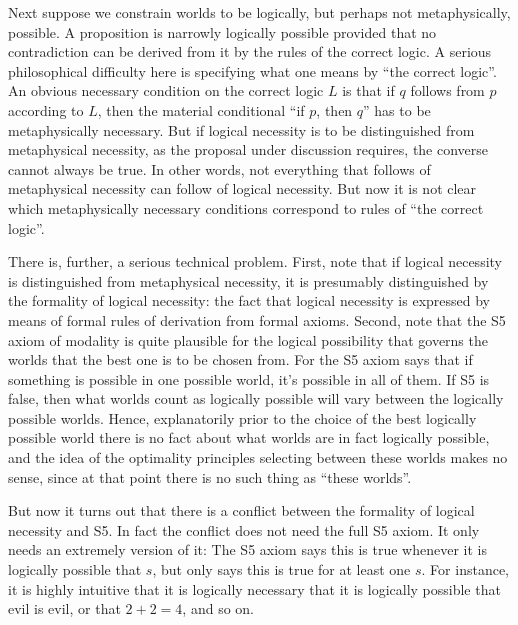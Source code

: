 Next suppose we constrain worlds to be logically, but perhaps not metaphysically, possible. A proposition is narrowly logically
possible provided that no contradiction can be derived from it by the rules of the correct logic. A serious philosophical 
difficulty here is specifying what one means by ``the correct logic''. An obvious necessary condition on the correct logic $L$
is that if $q$ follows from $p$ according to $L$, then the material conditional ``if $p$, then $q$'' has to be metaphysically
necessary. But if logical necessity is to be distinguished from metaphysical necessity, as the proposal under discussion requires,
the converse cannot always be true. In other words, not everything that follows of metaphysical necessity can follow of logical
necessity. But now it is not clear which metaphysically necessary conditions correspond to rules of ``the correct logic''.

There is, further, a serious technical problem. First, note that if logical necessity is distinguished from metaphysical necessity, it is presumably distinguished by the formality of logical necessity: the fact that logical necessity is expressed by means of 
formal rules of derivation from formal axioms. Second, note that the S5 axiom of modality is quite plausible for the
logical possibility that governs the worlds that the best one is to be chosen from. For the S5 axiom says that if something is possible 
in one possible world, it's possible in all of them. If S5 is false, then what worlds count as logically possible  
will vary between the logically possible worlds. Hence, explanatorily prior to the choice of the best logically possible world there is no fact about what worlds are in fact logically possible, and the idea of the optimality  principles selecting between these worlds makes no sense, since at that point there is no such thing as ``these worlds''. 

But now it turns out that there is a conflict between the formality of logical necessity and S5.
In fact the conflict does not need the full S5 axiom. It only needs 
an extremely version of it:
The S5 axiom says this is true whenever it is logically possible that $s$, but  only says this is true 
for at least one $s$. For instance, it is highly intuitive that it is logically necessary that it is logically possible 
that evil is evil, or that $2+2=4$, and so on.

